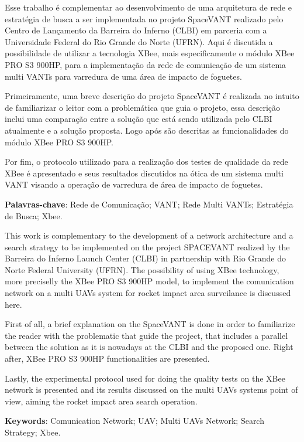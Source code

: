 

Esse trabalho é complementar ao desenvolvimento de uma arquitetura de rede e estratégia de busca a ser implementada no projeto SpaceVANT realizado pelo Centro de Lançamento da Barreira do Inferno (CLBI) em parceria com a Universidade Federal do Rio Grande do Norte (UFRN). Aqui é discutida a possibilidade de utilizar a tecnologia XBee, mais especificamente o módulo XBee PRO S3 900HP, para a implementação da rede de comunicação de um sistema multi VANTs para varredura de uma área de impacto de foguetes. 

Primeiramente, uma breve descrição do projeto SpaceVANT é realizada no intuito de familiarizar o leitor com a problemática que guia o projeto, essa descrição inclui uma comparação entre a solução que está sendo utilizada pelo CLBI atualmente e a solução proposta. Logo após são descritas as funcionalidades do módulo XBee PRO S3 900HP.

Por fim, o protocolo utilizado para a realização dos testes de qualidade da rede XBee é apresentado e seus resultados discutidos na ótica de um sistema multi VANT visando a operação de varredura de área de impacto de foguetes. 
 
\textbf{Palavras-chave}: Rede de Comunicação; VANT; Rede Multi VANTs; Estratégia de Busca; Xbee.


This work is complementary to the development of a network architecture and a search strategy to be implemented on the project SPACEVANT realized by the Barreira do Inferno Launch Center (CLBI) in partnership with Rio Grande do Norte Federal University (UFRN). The possibility of using XBee technology, more preciselly the XBee PRO S3 900HP model, to implement the comunication network on a multi UAVs system for rocket impact area surveilance is discussed here. 

First of all, a brief explanation on the SpaceVANT is done in order to familiarize the reader with the problematic that guide the project, that includes a parallel between the solution as it is nowadays at the CLBI and the proposed one. Right after, XBee PRO S3 900HP functionalities are presented.

Lastly, the experimental protocol used for doing the quality tests on the XBee network is presented and its results discussed on the multi UAVs systems point of view, aiming the rocket impact area search operation.   



\textbf{Keywords}: Comunication Network; UAV; Multi UAVs Network; Search Strategy; Xbee.